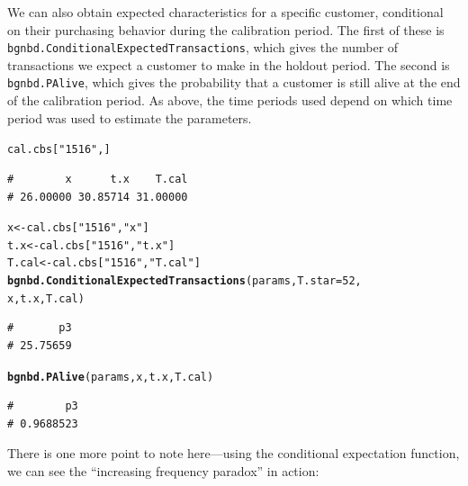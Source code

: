 \documentclass[10pt, letterpaper, onecolumn, oneside, final]{article}\usepackage[]{graphicx}\usepackage[]{color}
\makeatletter
\newcommand{\hlnum}[1]{\textcolor[rgb]{0.686,0.059,0.569}{#1}}%
\newcommand{\hlstr}[1]{\textcolor[rgb]{0.192,0.494,0.8}{#1}}%
\newcommand{\hlstd}[1]{\textcolor[rgb]{0.345,0.345,0.345}{#1}}%
\newcommand{\hlkwb}[1]{\textcolor[rgb]{0.69,0.353,0.396}{#1}}%
\newcommand{\hlkwc}[1]{\textcolor[rgb]{0.333,0.667,0.333}{#1}}%
\newcommand{\hlkwd}[1]{\textcolor[rgb]{0.737,0.353,0.396}{\textbf{#1}}}%
\newenvironment{kframe}{%
 \def\at@end@of@kframe{}%
 \ifinner\ifhmode%
  \def\at@end@of@kframe{\end{minipage}}%
  \begin{minipage}{\columnwidth}%
 \fi\fi%
 \def\FrameCommand##1{\hskip\@totalleftmargin \hskip-\fboxsep
 \colorbox{shadecolor}{##1}\hskip-\fboxsep
     \hskip-\linewidth \hskip-\@totalleftmargin \hskip\columnwidth}%
 \MakeFramed {\advance\hsize-\width
   \@totalleftmargin\z@ \linewidth\hsize
   \@setminipage}}%
 {\par\unskip\endMakeFramed%
 \at@end@of@kframe}
\newenvironment{knitrout}{}{} %
\makeatother
\begin{document}
We can also obtain expected characteristics for a specific customer,
conditional on their purchasing behavior during the calibration
period. The first of these is
\texttt{bgnbd.ConditionalExpectedTransactions}, which gives the number
of transactions we expect a customer to make in the holdout
period. The second is \texttt{bgnbd.PAlive}, which gives the
probability that a customer is still alive at the end of the
calibration period. As above, the time periods used depend on which
time period was used to estimate the parameters. 

\begin{knitrout}
\color{fgcolor}\begin{kframe}
\begin{alltt}
\hlstd{cal.cbs[}\hlstr{"1516"}\hlstd{,]}
\end{alltt}
\begin{verbatim}
#        x      t.x    T.cal 
# 26.00000 30.85714 31.00000
\end{verbatim}
\begin{alltt}
\hlstd{x} \hlkwb{<-} \hlstd{cal.cbs[}\hlstr{"1516"}\hlstd{,} \hlstr{"x"}\hlstd{]}
\hlstd{t.x} \hlkwb{<-} \hlstd{cal.cbs[}\hlstr{"1516"}\hlstd{,} \hlstr{"t.x"}\hlstd{]}
\hlstd{T.cal} \hlkwb{<-} \hlstd{cal.cbs[}\hlstr{"1516"}\hlstd{,} \hlstr{"T.cal"}\hlstd{]}
\hlkwd{bgnbd.ConditionalExpectedTransactions}\hlstd{(params,} \hlkwc{T.star} \hlstd{=} \hlnum{52}\hlstd{,}
                                     \hlstd{x, t.x, T.cal)}
\end{alltt}
\begin{verbatim}
#       p3 
# 25.75659
\end{verbatim}
\begin{alltt}
\hlkwd{bgnbd.PAlive}\hlstd{(params, x, t.x, T.cal)}
\end{alltt}
\begin{verbatim}
#        p3 
# 0.9688523
\end{verbatim}
\end{kframe}
\end{knitrout}

There is one more point to note here---using the conditional
expectation function, we can see the ``increasing frequency paradox''
in action:
\end{document}
